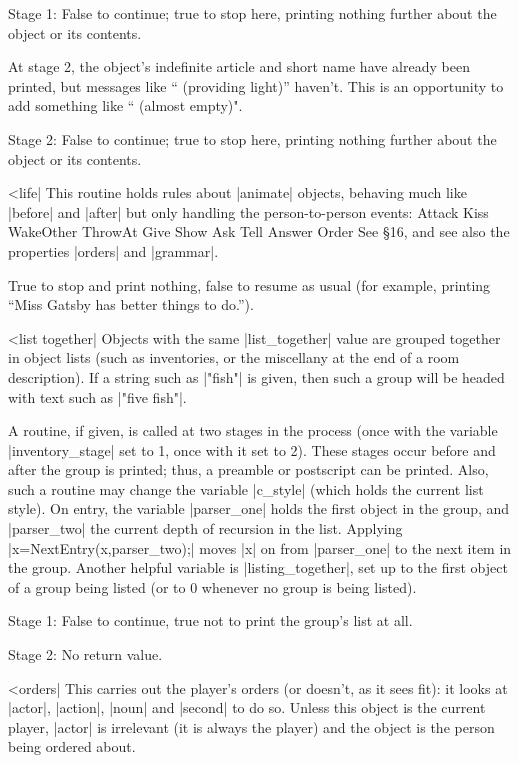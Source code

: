 \rr Stage 1: False to continue; true to stop here, printing nothing further
about the object or its contents.

\noindent At stage 2, the object's indefinite article and short name have
already been printed, but messages like `` (providing light)'' haven't. 
This is an opportunity to add something like `` (almost empty)".

\rr Stage 2: False to continue; true to stop here, printing nothing further
about the object or its contents.

^^|life|
This routine holds rules about |animate| objects, behaving much like
|before| and |after| but only handling the person-to-person events:
\beginstt
Attack Kiss WakeOther ThrowAt Give Show Ask Tell Answer Order
\endtt
See \S 16, and see also the properties |orders| and |grammar|.

\rr True to stop and print nothing, false to resume as usual (for example,
printing ``Miss Gatsby has better things to do.'').

^^|list together|
\fo
Objects with the same |list_together| value are grouped together in
object lists (such as inventories, or the miscellany at the end of a
room description).  If a string such as |"fish"| is given, then such
a group will be headed with text such as |"five fish"|.

\noindent A routine, if given, is called at two stages in the process
(once with the variable |inventory_stage| set to 1, once with it set to 2).
These stages occur before and after the group is printed; thus, a
preamble or postscript can be printed.  Also, such a routine may
change the variable |c_style| (which holds the current list style).
On entry, the variable |parser_one| holds the first object in the
group, and |parser_two| the current depth of recursion in the list.
Applying |x=NextEntry(x,parser_two);| moves |x| on from |parser_one|
to the next item in the group.  Another helpful variable is
|listing_together|, set up to the first object of a group being listed
(or to 0 whenever no group is being listed).

\rr Stage 1: False to continue, true not to print the group's list
at all.

\rr Stage 2: No return value.

^^|orders|
\fato  This carries out the player's
orders (or doesn't, as it sees fit): it looks at |actor|, |action|,
|noun| and |second| to do so.  Unless this object is the current
player, |actor| is irrelevant (it is always the player) and the
object is the person being ordered about.

